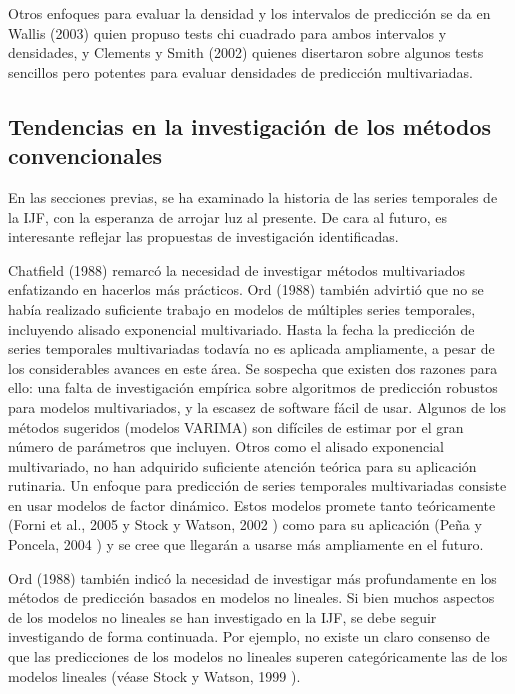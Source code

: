 \documentclass{llncs}
\begin{document}
Otros enfoques para evaluar la densidad y los intervalos de predicción se da en Wallis (2003) \cite{Wallis2003165} quien propuso tests chi cuadrado para ambos intervalos y densidades, y Clements y Smith (2002) quienes disertaron sobre algunos tests sencillos pero potentes para evaluar densidades de predicción multivariadas.

\subsection{Tendencias en la investigación de los métodos convencionales}
En las secciones previas, se ha examinado la historia de las series temporales de la IJF, con la esperanza de arrojar luz al presente. De cara al futuro, es interesante reflejar las propuestas de investigación identificadas. 

Chatfield (1988) \cite{Chatfield198819} remarcó la necesidad de investigar métodos multivariados enfatizando en hacerlos más prácticos. Ord (1988) \cite{Ord1988389} también advirtió que no se había realizado suficiente trabajo en modelos de múltiples series temporales, incluyendo alisado exponencial multivariado. Hasta la fecha la predicción de series temporales multivariadas todavía no es aplicada ampliamente, a pesar  de los considerables avances en este área. Se sospecha que existen dos razones para ello: una falta de investigación empírica sobre algoritmos de predicción robustos para modelos multivariados, y la escasez de software fácil de usar. Algunos de los métodos sugeridos (modelos VARIMA) son difíciles de estimar por el gran número de parámetros que incluyen. Otros como el alisado exponencial multivariado, no han adquirido suficiente atención teórica para su aplicación rutinaria. Un enfoque para predicción de series temporales multivariadas consiste en usar modelos de factor dinámico. Estos modelos promete tanto teóricamente (Forni et al., 2005 \cite{Forni2005830} y Stock y Watson, 2002 \cite{Stock20021167}) como para su aplicación (Peña y Poncela, 2004 \cite{Pena2004291}) y se cree que llegarán a usarse más ampliamente en el futuro.

Ord (1988) \cite{Ord1988389} también indicó la necesidad de investigar más profundamente en los métodos de predicción basados en modelos no lineales. Si bien muchos aspectos de los modelos no lineales se han investigado en la IJF, se debe seguir investigando de forma continuada. Por ejemplo, no existe un claro consenso de que las predicciones de los modelos no lineales superen categóricamente las de los modelos lineales (véase Stock y Watson, 1999 \cite{Stock19991}). 
\end{document}
